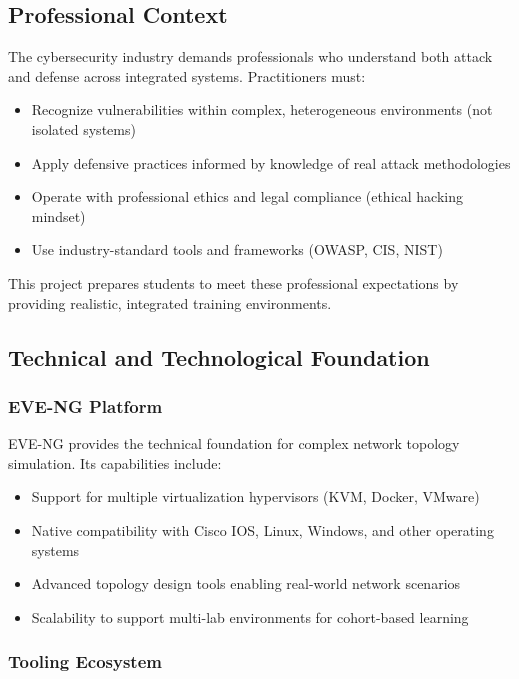 \subsection{Professional Context}

The cybersecurity industry demands professionals who understand both attack and 
defense across integrated systems. Practitioners must:

\begin{itemize}
    \item Recognize vulnerabilities within complex, heterogeneous environments 
          (not isolated systems)
    \item Apply defensive practices informed by knowledge of real attack methodologies
    \item Operate with professional ethics and legal compliance 
          (ethical hacking mindset)
    \item Use industry-standard tools and frameworks (OWASP, CIS, NIST)
\end{itemize}

This project prepares students to meet these professional expectations by 
providing realistic, integrated training environments.

\subsection{Technical and Technological Foundation}

\subsubsection{EVE-NG Platform}

EVE-NG provides the technical foundation for complex network topology simulation. 
Its capabilities include:

\begin{itemize}
    \item Support for multiple virtualization hypervisors (KVM, Docker, VMware)
    \item Native compatibility with Cisco IOS, Linux, Windows, and other 
          operating systems
    \item Advanced topology design tools enabling real-world network scenarios
    \item Scalability to support multi-lab environments for cohort-based learning
\end{itemize}

\subsubsection{Tooling Ecosystem}

